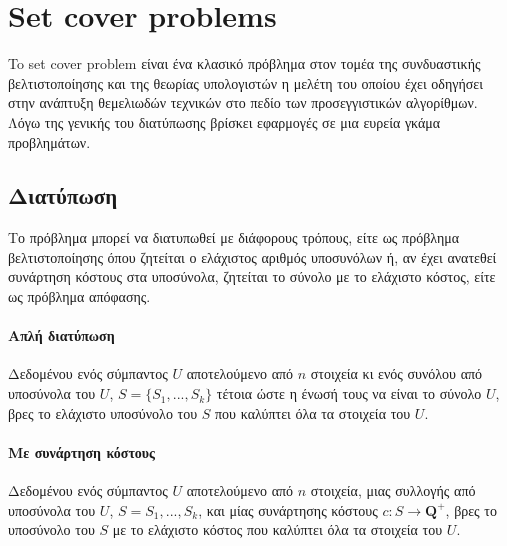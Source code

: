 
\chapter{Set cover problems} %

\label{Chapter1} %

To set cover problem είναι ένα κλασικό πρόβλημα στον τομέα της συνδυαστικής βελτιστοποίησης και της θεωρίας υπολογιστών η μελέτη του οποίου έχει οδηγήσει στην ανάπτυξη θεμελιωδών τεχνικών στο πεδίο των προσεγγιστικών αλγορίθμων. Λόγω της γενικής του διατύπωσης βρίσκει εφαρμογές σε μια ευρεία γκάμα προβλημάτων.

\section{Διατύπωση}
Το πρόβλημα μπορεί να διατυπωθεί με διάφορους τρόπους, είτε ως πρόβλημα βελτιστοποίησης όπου ζητείται ο ελάχιστος αριθμός υποσυνόλων ή, αν έχει ανατεθεί συνάρτηση κόστους στα υποσύνολα, ζητείται το σύνολο με το ελάχιστο κόστος, είτε ως πρόβλημα απόφασης. 


\subsubsection{Απλή διατύπωση}
Δεδομένου ενός σύμπαντος $U$ αποτελούμενο από $n$ στοιχεία κι ενός συνόλου από υποσύνολα του $U$, $S = \{S_1,...,S_k\}$ τέτοια ώστε η ένωσή τους να είναι το σύνολο $U$, βρες το ελάχιστο υποσύνολο του $S$ που καλύπτει όλα τα στοιχεία του $U$.

\subsubsection{Με συνάρτηση κόστους}
Δεδομένου ενός σύμπαντος $U$ αποτελούμενο από $n$ στοιχεία, μιας συλλογής από υποσύνολα του $U$, $S = {S_1,...,S_k}$, και μίας συνάρτησης κόστους $c : S \rightarrow {\boldsymbol{Q}^+}$, βρες το υποσύνολο του $S$ με το ελάχιστο κόστος που καλύπτει όλα τα στοιχεία του $U$.

